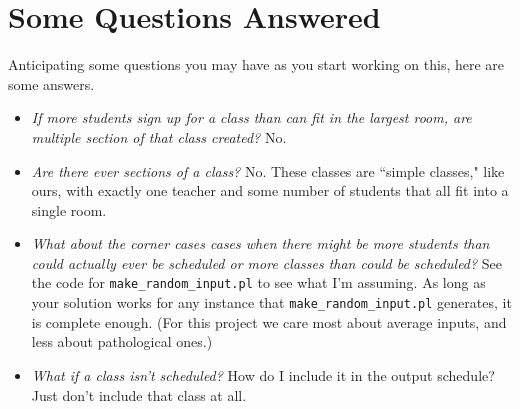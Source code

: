 \documentclass[12pt]{article}
\begin{document}
\section{Some Questions Answered}
Anticipating some questions you may have as you start working on this, here are some answers.
\begin{itemize}
\item \emph{If more students sign up for a class than can fit in the largest room, are multiple section of that class created?} No.
\item \emph{Are there ever sections of a class?} No. These classes are ``simple classes," like ours, with exactly one teacher and some number of students that all fit into a single room.
\item \emph{What about the corner cases cases when there might be more students than could actually ever be scheduled or more classes than could be scheduled?} See the code for \texttt{make\_random\_input.pl} to see what I'm assuming. As long as your solution works for any instance that \texttt{make\_random\_input.pl} generates, it is complete enough. (For this project we care most about average inputs, and less about pathological ones.)
\item \emph{What if a class isn't scheduled?} How do I include it in the output schedule? Just don't include that class at all.
\end{itemize}
\end{document}
